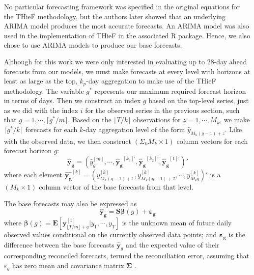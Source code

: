 \documentclass[thesis]{umassthesis}  %
\begin{document}
No particular forecasting framework was specified in the original equations for the THieF methodology, but the authors later showed that an underlying ARIMA model produces the most accurate forecasts. An ARIMA model was also used in the implementation of THieF in the associated R package\cite{thief}. Hence, we also chose to use ARIMA models to produce our base forecasts.

Although for this work we were only interested in evaluating up to 28-day ahead forecasts from our models, we must make forecasts at every level with horizons at least as large as the top, $k_p$-day aggregation to make use of the THieF methodology. The variable $g^*$ represents our maximum required forecast horizon in terms of days. Then we construct an index $g$ based on the top-level series, just as we did with the index $i$ for the observed series in the previous section, such that $g = 1, \cdots, \lceil g^*/m \rceil$\cite{thief}. Based on the $\lfloor T/k \rfloor$ observations for $z = 1, \cdots, M_k$, we make $\lceil g^*/k \rceil$ forecasts for each $k$-day aggregation level of the form $\hat{y}_{M_k(g-1) + z}$. Like with the observed data, we then construct $(\Sigma_k M_k \times 1)$ column vectors for each forecast horizon $g$: \[\boldsymbol{\hat{y}_g} = (\hat{y}_g^{[m]}, \cdots, \boldsymbol{\hat{y}_g}^{[k_3]'}, \boldsymbol{\hat{y}_g}^{[k_2]'}, \boldsymbol{\hat{y}_g}^{[1]'})'\] where each element $\boldsymbol{\hat{y_g}}^{[k]} = (y_{M_k(g-1)+1}^{[k]}, y_{M_k(g-1)+2}^{[k]}, \cdots, y_{M_kg}^{[k]})'$ is a $(M_k \times 1)$ column vector of the base forecasts from that level\cite{thief}.

The base forecasts may also be expressed as \[\boldsymbol{\hat{y}_g} = \boldsymbol{S \beta}(g) + \boldsymbol{\varepsilon_g}\] where $\boldsymbol{\beta}(g) = \boldsymbol{E}[\boldsymbol{y}_{\lfloor T/m \rfloor + g}^{[1]} | y_1, \cdots, y_T]$ is the unknown mean of future daily observed values conditional on the currently observed data points; and $\boldsymbol{\varepsilon_g}$ is the difference between the base forecasts $\boldsymbol{\hat{y}}_g$ and the expected value of their corresponding reconciled forecasts, termed the reconciliation error, assuming that $\varepsilon_g$ has zero mean and covariance matrix $\boldsymbol{\Sigma}$ \cite{thief}.
\end{document}
